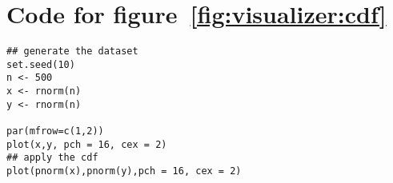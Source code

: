 \section{Code for figure~\ref{fig:visualizer:cdf}}
\label{sec:appendicies:cdf}
{
\begin{lstlisting}
## generate the dataset
set.seed(10)
n <- 500
x <- rnorm(n)
y <- rnorm(n)

par(mfrow=c(1,2))
plot(x,y, pch = 16, cex = 2)
## apply the cdf
plot(pnorm(x),pnorm(y),pch = 16, cex = 2)
\end{lstlisting}
}

%
%
%
%
%
%
